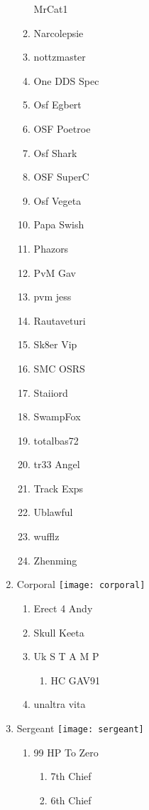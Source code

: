 \documentclass{article}
\begin{document}
\begin{enumerate}[I]
\begin{enumerate}[I]
	MrCat1
      \item
	Narcolepsie
      \item
	nottzmaster
      \item
	One DDS Spec
      \item
	Osf Egbert
      \item
	OSF Poetroe
      \item
	Osf Shark
      \item
	OSF SuperC
      \item
	Osf Vegeta
      \item
	Papa Swish
      \item
	Phazors
      \item
	PvM Gav
      \item
	pvm jess
      \item
	Rautaveturi
      \item
	Sk8er Vip
      \item
	SMC OSRS
      \item
	Staiiord
      \item
	SwampFox
      \item
	totalbas72
      \item
	tr33 Angel
      \item
	Track Exps
      \item
	Ublawful
      \item
	wufflz
      \item
	Zhenming
    \end{enumerate}
  \item
    Corporal \texttt{[image: corporal]}
    \begin{enumerate}[I]
      \item
	Erect 4 Andy
      \item
	Skull Keeta
      \item
	Uk S T A M P
	\begin{enumerate}[I]
	  \item
	    HC GAV91
	\end{enumerate}
      \item
	unaltra vita
    \end{enumerate}
  \item
    Sergeant \texttt{[image: sergeant]}
    \begin{enumerate}[I]
      \item 
	99 HP To Zero
	\begin{enumerate}[I]
	  \item
	    7th Chief
	  \item
	    6th Chief
	\end{enumerate}

\end{enumerate}
\end{enumerate}
\end{document}
